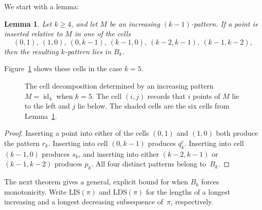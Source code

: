 \documentclass[11pt]{amsart}
\newcommand{\id}{\operatorname{id}}
\theoremstyle{plain}
\newtheorem{lemma}[theorem]{Lemma}
\theoremstyle{definition}
\theoremstyle{remark}
\begin{document}
We start with a lemma:

\begin{lemma}\label{lem:dangerous-cells}
  Let $k \geq 4$, and let $M$ be an increasing $(k-1)$-pattern.  If a point is inserted relative to
  $M$ in one of the cells
  \[
    (0,1),\ (1,0),\ (0,k-1),\ (k-1,0),\ (k-2,k-1),\ (k-1,k-2),
  \]
  then the resulting $k$-pattern lies in $B_k$.
\end{lemma}

Figure~\ref{fig:dangerous-cells-k5} shows these cells in the case $k=5$.

\begin{figure}[ht]
  \centering
  \caption{The cell decomposition determined by an increasing pattern $M=\id_4$ when $k=5$.
    The cell $(i,j)$ records that $i$ points of $M$ lie to the left and $j$ lie below.
    The shaded cells are the six cells from Lemma~\ref{lem:dangerous-cells}.}
  \label{fig:dangerous-cells-k5}
\end{figure}

\begin{proof}
  Inserting a point into either of the cells $(0,1)$ and $(1,0)$ both produce the pattern $r_k$. Inserting into cell $(0,k{-}1)$
  produces $q_k^c$. Inserting into cell $(k{-}1,0)$ produces $s_k$, and inserting into either $(k{-}2,k{-}1)$ or $(k{-}1,k{-}2)$
  produces $p_k$.  All four distinct patterns belong to~$B_k$.
\end{proof}

The next theorem gives a general, explicit bound for when $B_k$ forces monotonicity.
Write $\mathrm{LIS}(\pi)$ and $\mathrm{LDS}(\pi)$ for the lengths of a longest increasing and a
longest decreasing subsequence of~$\pi$, respectively.
\end{document}
